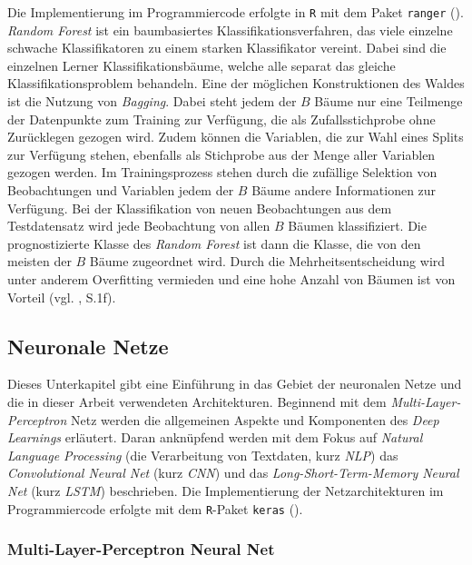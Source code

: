 \documentclass[a4paper,11pt]{article}
\begin{document}
Die Implementierung im Programmiercode erfolgte in \texttt{R} mit dem Paket \texttt{ranger} (\cite{ranger}).\\

\textit{Random Forest} ist ein baumbasiertes Klassifikationsverfahren, das viele einzelne schwache Klassifikatoren zu einem starken Klassifikator vereint. Dabei sind die einzelnen Lerner Klassifikationsbäume, welche alle separat das gleiche Klassifikationsproblem behandeln. Eine der möglichen Konstruktionen des Waldes ist die Nutzung von \textit{Bagging}. Dabei steht jedem der $B$ Bäume nur eine Teilmenge der Datenpunkte zum Training zur Verfügung, die als Zufallsstichprobe ohne Zurücklegen gezogen wird. Zudem können die Variablen, die zur Wahl eines Splits zur Verfügung stehen, ebenfalls als Stichprobe aus der Menge aller Variablen gezogen werden. Im Trainingsprozess stehen durch die zufällige Selektion von Beobachtungen und Variablen jedem der $B$ Bäume andere Informationen zur Verfügung. Bei der Klassifikation von neuen Beobachtungen aus dem Testdatensatz wird jede Beobachtung von allen $B$ Bäumen klassifiziert. Die prognostizierte Klasse des \textit{Random Forest} ist dann die Klasse, die von den meisten der $B$ Bäume zugeordnet wird. Durch die Mehrheitsentscheidung wird unter anderem Overfitting vermieden und eine hohe Anzahl von Bäumen ist von Vorteil (vgl. \cite{RF}, S.1f). 



\subsection{Neuronale Netze} \label{kap:neuralNets}

Dieses Unterkapitel gibt eine Einführung in das Gebiet der neuronalen Netze und die in dieser Arbeit verwendeten Architekturen. Beginnend mit dem \textit{Multi-Layer-Perceptron} Netz werden die allgemeinen Aspekte und Komponenten des \textit{Deep Learnings} erläutert. Daran anknüpfend werden mit dem Fokus auf \textit{Natural Language Processing} (die Verarbeitung von Textdaten, kurz \textit{NLP}) das \textit{Convolutional Neural Net} (kurz \textit{CNN}) und das \textit{Long-Short-Term-Memory Neural Net} (kurz \textit{LSTM}) beschrieben. Die Implementierung der Netzarchitekturen im Programmiercode erfolgte mit dem \texttt{R}-Paket \texttt{keras} (\cite{kerasR}).


\subsubsection{Multi-Layer-Perceptron Neural Net}
\end{document}
